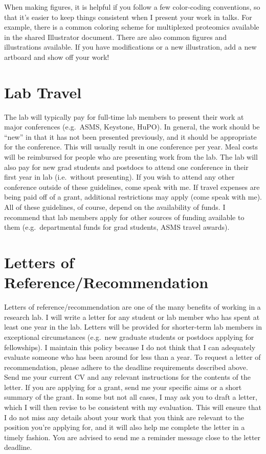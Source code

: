 \documentclass[
]{book}
\begin{document}
When making figures, it is helpful if you follow a few color-coding conventions, so that it's easier to keep things consistent when I present your work in talks. For example, there is a common coloring scheme for multiplexed proteomics available in the shared Illustrator document. There are also common figures and illustrations available. If you have modifications or a new illustration, add a new artboard and show off your work!

\hypertarget{lab-travel}{%
\section{Lab Travel}\label{lab-travel}}

The lab will typically pay for full-time lab members to present their work at major conferences (e.g.~ASMS, Keystone, HuPO). In general, the work should be ``new'' in that it has not been presented previously, and it should be appropriate for the conference. This will usually result in one conference per year. Meal costs will be reimbursed for people who are presenting work from the lab. The lab will also pay for new grad students and postdocs to attend one conference in their first year in lab (i.e.~without presenting). If you wish to attend any other conference outside of these guidelines, come speak with me. If travel expenses are being paid off of a grant, additional restrictions may apply (come speak with me). All of these guidelines, of course, depend on the availability of funds. I recommend that lab members apply for other sources of funding available to them (e.g.~departmental funds for grad students, ASMS travel awards).

\hypertarget{letters-of-referencerecommendation}{%
\section{Letters of Reference/Recommendation}\label{letters-of-referencerecommendation}}

Letters of reference/recommendation are one of the many benefits of working in a research lab. I will write a letter for any student or lab member who has spent at least one year in the lab. Letters will be provided for shorter-term lab members in exceptional circumstances (e.g.~new graduate students or postdocs applying for fellowships). I maintain this policy because I do not think that I can adequately evaluate someone who has been around for less than a year.
To request a letter of recommendation, please adhere to the deadline requirements described above. Send me your current CV and any relevant instructions for the contents of the letter. If you are applying for a grant, send me your specific aims or a short summary of the grant. In some but not all cases, I may ask you to draft a letter, which I will then revise to be consistent with my evaluation. This will ensure that I do not miss any details about your work that you think are relevant to the position you're applying for, and it will also help me complete the letter in a timely fashion. You are advised to send me a reminder message close to the letter deadline.
\end{document}
